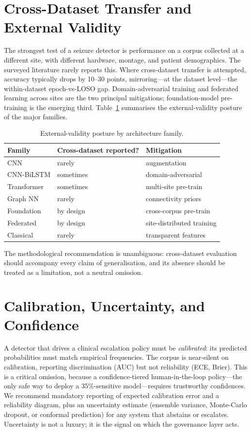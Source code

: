 \section{Cross-Dataset Transfer and External Validity}
The strongest test of a seizure detector is performance on a corpus collected at a different site, with different hardware, montage, and patient demographics. The surveyed literature rarely reports this. Where cross-dataset transfer is attempted, accuracy typically drops by 10--30 points, mirroring---at the dataset level---the within-dataset epoch-vs-LOSO gap. Domain-adversarial training \citep{ep250515203} and federated learning across sites \citep{ep250808159} are the two principal mitigations; foundation-model pre-training \citep{ep251108861} is the emerging third. Table~\ref{tab:xfer} summarises the external-validity posture of the major families.
\begin{table}[h]\centering\caption{External-validity posture by architecture family.}\label{tab:xfer}
\footnotesize\begin{tabular}{lll}\toprule
Family & Cross-dataset reported? & Mitigation\\\midrule
CNN & rarely & augmentation\\
CNN-BiLSTM & sometimes & domain-adversarial\\
Transformer & sometimes & multi-site pre-train\\
Graph NN & rarely & connectivity priors\\
Foundation & by design & cross-corpus pre-train\\
Federated & by design & site-distributed training\\
Classical & rarely & transparent features\\\bottomrule
\end{tabular}\end{table}
The methodological recommendation is unambiguous: cross-dataset evaluation should accompany every claim of generalisation, and its absence should be treated as a limitation, not a neutral omission.

\section{Calibration, Uncertainty, and Confidence}
A detector that drives a clinical escalation policy must be \emph{calibrated}: its predicted probabilities must match empirical frequencies. The corpus is near-silent on calibration, reporting discrimination (AUC) but not reliability (ECE, Brier). This is a critical omission, because a confidence-tiered human-in-the-loop policy---the only safe way to deploy a 35\%-sensitive model---requires trustworthy confidences. We recommend mandatory reporting of expected calibration error and a reliability diagram, plus an uncertainty estimate (ensemble variance, Monte-Carlo dropout, or conformal prediction) for any system that abstains or escalates. Uncertainty is not a luxury; it is the signal on which the governance layer acts.

